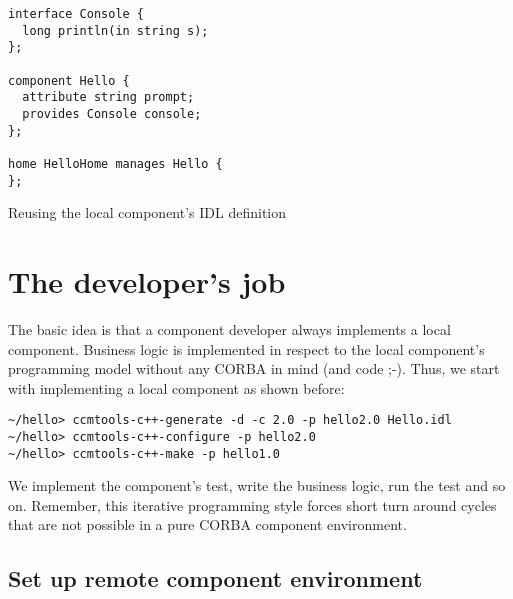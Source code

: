 \begin{Example}
\begin{minifbox}
\begin{small}
\begin{verbatim}
interface Console {
  long println(in string s);
};

component Hello {
  attribute string prompt;
  provides Console console;
};

home HelloHome manages Hello {
};
\end{verbatim}
\end{small}
\end{minifbox}
\caption{Reusing the local component's IDL definition}
\label{example:one-component-idl}
\end{Example}


\section{The developer's job}

The basic idea is that a component developer always implements a local component.
Business logic is implemented in respect to the local component's programming
model without any CORBA in mind (and code ;-).
Thus, we start with implementing a local component as shown before:
\begin{small}
\begin{verbatim}
~/hello> ccmtools-c++-generate -d -c 2.0 -p hello2.0 Hello.idl
~/hello> ccmtools-c++-configure -p hello2.0
~/hello> ccmtools-c++-make -p hello1.0
\end{verbatim}
\end{small}

We implement the component's test, write the business logic, run the test and so on.
Remember, this iterative programming style forces short turn around cycles that are
not possible in a pure CORBA component environment.



\subsection{Set up remote component environment}

